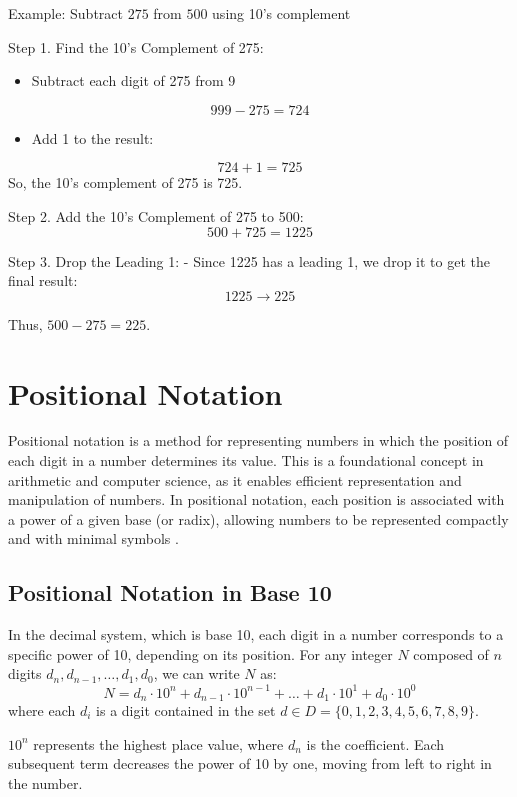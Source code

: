 \vspace{\baselineskip}\par
Example: Subtract \( 275 \) from \( 500 \) using 10’s complement
\vspace{\baselineskip}\par
Step 1. Find the 10’s Complement of 275:
  \begin{itemize}
    \item Subtract each digit of 275 from 9
  \end{itemize}  
     \[
     999 - 275 = 724
     \]
  \begin{itemize}
    \item Add 1 to the result:
  \end{itemize}
     \[
     724 + 1 = 725
     \]
   So, the 10’s complement of 275 is 725.

\vspace{\baselineskip}\par
Step 2. Add the 10’s Complement of 275 to 500:
   \[
   500 + 725 = 1225
   \]

Step 3. Drop the Leading 1:
   - Since 1225 has a leading 1, we drop it to get the final result:
   \[
   1225 \rightarrow 225
   \]

Thus, \( 500 - 275 = 225 \).


\section{Positional Notation}

Positional notation is a method for representing numbers in which the position of each digit in a number determines its value. This is a foundational concept in arithmetic and computer science, as it enables efficient representation and manipulation of numbers. In positional notation, each position is associated with a power of a given base (or radix), allowing numbers to be represented compactly and with minimal symbols \cite{ross2008}.

\subsection{Positional Notation in Base 10}

In the decimal system, which is base 10, each digit in a number corresponds to a specific power of 10, depending on its position. For any integer \( N \) composed of \( n \) digits \( d_n, d_{n-1}, \ldots, d_1, d_0 \), we can write \( N \) as:
\[
N = d_n \cdot 10^n + d_{n-1} \cdot 10^{n-1} + \ldots + d_1 \cdot 10^1 + d_0 \cdot 10^0
\]
where each \( d_i \) is a digit contained in the set \(d \in D = \{0, 1, 2, 3, 4, 5, 6, 7, 8, 9\}
 \). 
 \vspace{\baselineskip}\par
 \( 10^n \) represents the highest place value, where \( d_n \) is the coefficient.
Each subsequent term decreases the power of 10 by one, moving from left to right in the number.

